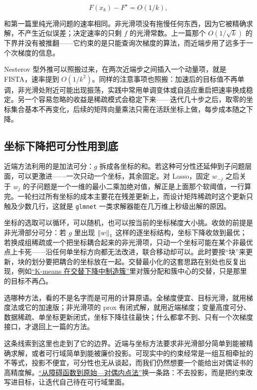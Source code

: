 \[
F(x_k)-F^\star=O(1/k),
\]

和第一篇里纯光滑问题的速率相同。非光滑项没有拖慢任何东西，因为它被精确求解，不产生近似误差；决定速率的只剩 \(f\) 的光滑常数。上一篇那个 \(O(1/\sqrt k)\) 的下界并没有被推翻——它约束的是只能查询次梯度的算法，而近端步用了远多于一个次梯度的信息。

Nesterov 型外推可以照搬过来，在两次近端步之间插入一个动量项，就是 FISTA，速率提到 \(O(1/k^2)\)。同样的注意事项也照搬：加速后的目标值不再单调，非光滑处附近可能出现振荡，实践中常用单调变体或自适应重启把速率换成稳定。另一个容易忽略的收益是稀疏模式会稳定下来——迭代几十步之后，取零的坐标集合基本不再变化，后续的矩阵向量乘法只需在活跃坐标上做，每步成本随之下降。

\subsection{坐标下降把可分性用到底}

近端方法利用的是加法可分：\(g\) 拆成各坐标的和。若这种可分性还延伸到子问题层面，可以更激进——一次只动一个坐标，其余固定。对 Lasso，固定 \(w_{-j}\) 之后关于 \(w_j\) 的子问题是一个一维的最小二乘加绝对值，解正是上面那个软阈值，一行算完。一轮扫过所有坐标的成本主要花在残差更新上，而设计矩阵稀疏时这个更新只触及少数几行，这就是 \texttt{glmnet} 一类求解器能在几万维上秒级出解的原因。

坐标的选取可以循环，可以随机，也可以按当前的坐标梯度大小挑。收敛的前提是非光滑部分可分：若 \(g\) 里出现 \(\left\lVert w\right\rVert_1\) 这样的逐坐标结构，坐标下降收敛到最优；若换成组稀疏或一个把坐标耦合起来的非光滑项，只动一个坐标可能在某个非最优点上卡死——沿任何单坐标方向都无法改进，联合移动却可以。此时要按``块''来更新，块的划分要把耦合的坐标放在一起。交替最小化的这套思路在别处也反复出现，例如\hyperref[sec:13-Machine-Learning/05-Clustering-and-Data-Geometry/01]{``K-means 在交替下降中制造簇''}里对簇分配和簇中心的交替，只是那里的目标不再凸。

选哪种方法，看的不是名字而是可用的计算原语。全梯度便宜、目标光滑，就用梯度法或它的加速版；非光滑项的 prox 有闭式解，就用近端梯度；变量高度可分、数据稀疏、单坐标更新闭式，坐标下降往往最快；什么都拿不到、只有一个次梯度接口，才退回上一篇的方法。

这条线索到这里也走到了它的边界。近端与坐标方法要求非光滑部分简单到能被精确求解，或者可行域简单到能被廉价投影。可现实中的约束经常是一组互相牵扯的不等式，投影不便宜，可分性也无从谈起，而我们仍然想要一个能给出对偶证书的高精度解。\hyperref[sec:09-Convex-Optimization/06-Optimization-Algorithms/05]{``从障碍函数到原始---对偶内点法''}换一条路：不去投影，而是把约束改写进目标，让迭代自己待在可行域里面。
